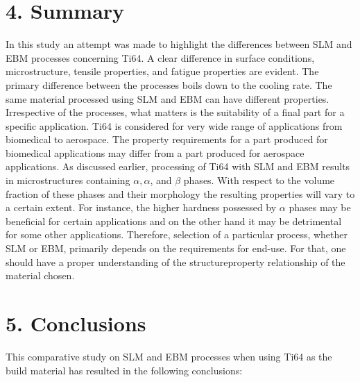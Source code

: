\documentclass[10pt]{article}
\begin{document}
\section*{4. Summary}
In this study an attempt was made to highlight the differences between SLM and EBM processes concerning Ti64. A clear difference in surface conditions, microstructure, tensile properties, and fatigue properties are evident. The primary difference between the processes boils down to the cooling rate. The same material processed using SLM and EBM can have different properties. Irrespective of the processes, what matters is the suitability of a final part for a specific application. Ti64 is considered for very wide range of applications from biomedical to aerospace. The property requirements for a part produced for biomedical applications may differ from a part produced for aerospace applications. As discussed earlier, processing of Ti64 with SLM and EBM results in microstructures containing $\alpha, \alpha$, and $\beta$ phases. With respect to the volume fraction of these phases and their morphology the resulting properties will vary to a certain extent. For instance, the higher hardness possessed by $\alpha$ phases may be beneficial for certain applications and on the other hand it may be detrimental for some other applications. Therefore, selection of a particular process, whether SLM or EBM, primarily depends on the requirements for end-use. For that, one should have a proper understanding of the structureproperty relationship of the material chosen.

\section*{5. Conclusions}
This comparative study on SLM and EBM processes when using Ti64 as the build material has resulted in the following conclusions:
\end{document}
